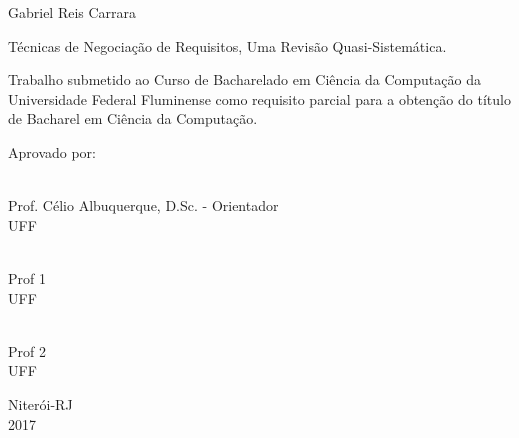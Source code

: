 \documentclass[a4paper,oneside,12pt]{book}
\begin{document}
\newpage


\begin{center}
Gabriel Reis Carrara

\vspace{1.0cm}

Técnicas de Negociação de Requisitos, Uma Revisão Quasi-Sistemática.

\vspace{1.0cm}

\begin{flushright}
\begin{minipage}{0.5\textwidth}

Trabalho submetido ao Curso de \linebreak Bacharelado em Ciência da
Computação da Universidade Federal Fluminense como
requisito parcial para a obtenção do título de Bacharel em Ciência da
Computação.

\end{minipage}
\end{flushright}

\vfill

\begin{flushleft}

Aprovado por:

\end{flushleft}


\vfill

\hrulefill \\Prof. Célio Albuquerque, D.Sc. - Orientador\\UFF\\

\vfill

\hrulefill \\Prof 1 \\UFF\\

\vfill

\hrulefill \\Prof 2 \\UFF\\

\vfill

Niterói-RJ\\2017

\end{center}
\end{document}
